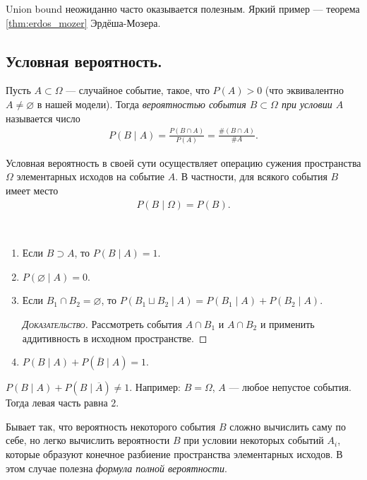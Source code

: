 \documentclass[../main.tex]{subfiles}
\begin{document}
Union bound неожиданно часто оказывается полезным. Яркий пример --- теорема \ref{thm:erdos_mozer} Эрдёша-Мозера.

\subsection{Условная вероятность.}

\begin{df}
 \label{df:conditinal_probability}
 Пусть $ A \subset \Omega $ --- случайное событие, такое, что $ P(A) > 0 $ (что эквивалентно $ A \neq \varnothing $ в нашей модели). Тогда \textit{вероятностью события $ B \subset \Omega $ при условии $ A $} называется  число
 \begin{align*}
  P(B \mid A) = \frac{P(B \cap A)}{P(A)} = \frac{\# (B \cap A)}{\# A}.
 \end{align*}
\end{df}

Условная вероятность в своей сути осуществляет операцию сужения пространства $ \Omega $ элементарных исходов на событие $ A $. В частности, для всякого события $ B $ имеет место
\begin{align*}
 P(B \mid \Omega) = P(B).
\end{align*}

\begin{prop}\
 \begin{enumerate}
  \item Если $B \supset A$, то $P(B \mid A) = 1$.
  \item $P(\varnothing \mid A) = 0$.
  \item Если $B_1 \cap B_2 = \varnothing$, то $P(B_1 \sqcup B_2 \mid A) = P(B_1 \mid A) + P(B_2 \mid A) $.
   \begin{proof}[\normalfont\textsc{Доказательство}]
    Рассмотреть события $A \cap B_1$ и $A \cap B_2$ и применить аддитивность в исходном пространстве.
   \end{proof}
  \item $P(B \mid A) + P(\overline B \mid A) = 1$.
 \end{enumerate} 
\end{prop}

\begin{remrk*}
 $P(B \mid A) + P(B \mid \overline A) \neq 1$. Например: $B = \Omega$, $A$ --- любое непустое события. Тогда левая часть равна $2$.
\end{remrk*}

Бывает так, что вероятность некоторого события $ B $ сложно вычислить саму по себе, но легко вычислить вероятности $ B $ при условии некоторых событий $ A_i $, которые образуют конечное разбиение пространства элементарных исходов. В этом случае полезна \textit{формула полной вероятности}.
\end{document}
